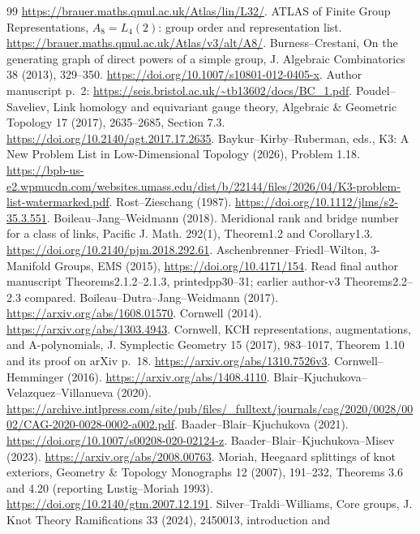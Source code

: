 \documentclass[11pt]{article}
\begin{document}
{\begin{thebibliography}{99}
\url{https://brauer.maths.qmul.ac.uk/Atlas/lin/L32/}.
 ATLAS of Finite Group Representations,
$A_8=L_4(2)$: group order and representation list.
\url{https://brauer.maths.qmul.ac.uk/Atlas/v3/alt/A8/}.
 Burness--Crestani, On the generating graph of direct
powers of a simple group, J. Algebraic Combinatorics 38 (2013),
329--350. \url{https://doi.org/10.1007/s10801-012-0405-x}.
Author manuscript p.~2:
\url{https://seis.bristol.ac.uk/~tb13602/docs/BC_1.pdf}.
 Poudel--Saveliev, Link homology and equivariant gauge
theory, Algebraic \& Geometric Topology 17 (2017), 2635--2685,
Section 7.3. \url{https://doi.org/10.2140/agt.2017.17.2635}.
 Baykur--Kirby--Ruberman, eds., K3: A New Problem List in
Low-Dimensional Topology (2026), Problem 1.18.
\url{https://bpb-us-e2.wpmucdn.com/websites.umass.edu/dist/b/22144/files/2026/04/K3-problem-list-watermarked.pdf}.
 Rost--Zieschang (1987).
\url{https://doi.org/10.1112/jlms/s2-35.3.551}.
 Boileau--Jang--Weidmann (2018).
Meridional rank and bridge number for a class of links,
Pacific J. Math. 292(1), Theorem1.2 and Corollary1.3.
\url{https://doi.org/10.2140/pjm.2018.292.61}.
 Aschenbrenner--Friedl--Wilton, 3-Manifold Groups,
EMS (2015), \url{https://doi.org/10.4171/154}.
Read final author manuscript Theorems2.1.2--2.1.3,
printedpp30--31; earlier author-v3 Theorems2.2--2.3 compared.
 Boileau--Dutra--Jang--Weidmann (2017).
\url{https://arxiv.org/abs/1608.01570}.
 Cornwell (2014).
\url{https://arxiv.org/abs/1303.4943}.
 Cornwell, KCH representations, augmentations,
and A-polynomials, J. Symplectic Geometry 15 (2017), 983--1017,
Theorem 1.10 and its proof on arXiv p.~18.
\url{https://arxiv.org/abs/1310.7526v3}.
 Cornwell--Hemminger (2016).
\url{https://arxiv.org/abs/1408.4110}.
 Blair--Kjuchukova--Velazquez--Villanueva (2020).
\url{https://archive.intlpress.com/site/pub/files/_fulltext/journals/cag/2020/0028/0002/CAG-2020-0028-0002-a002.pdf}.
 Baader--Blair--Kjuchukova (2021).
\url{https://doi.org/10.1007/s00208-020-02124-z}.
 Baader--Blair--Kjuchukova--Misev (2023).
\url{https://arxiv.org/abs/2008.00763}.
 Moriah, Heegaard splittings of knot exteriors,
Geometry \& Topology Monographs 12 (2007), 191--232,
Theorems 3.6 and 4.20 (reporting Lustig--Moriah 1993).
\url{https://doi.org/10.2140/gtm.2007.12.191}.
 Silver--Traldi--Williams, Core groups,
J. Knot Theory Ramifications 33 (2024), 2450013, introduction and

\end{thebibliography}}
\end{document}
